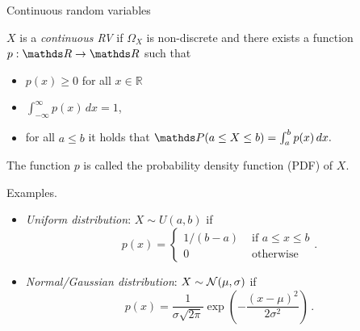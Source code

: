 \documentclass[11pt,compress,t,notes=noshow, xcolor=table]{beamer}
\begin{document}
\begin{vbframe}{Continuous random variables} 
	
	$X$ is a \emph{continuous RV} if $\Omega_X$ is non-discrete and there exists a function $p: \R \to \R$ such that 
%	
	\begin{itemize}
%		
		\item 
		$p(x) \geq 0$ for all $x \in \mathbb{R}$
%		
		\item $\int_{-\infty}^\infty p(x) \, dx = 1$,
%		
		\item for all $a \leq b$ it holds that	$
		\P(a \leq X \leq b) = \int_a^b p(x) \, dx .
		$
%
	\end{itemize} 
% 
	The function $p$ is called the probability density function (PDF) of $X$.
	
	\lz
	
	Examples.
	
	\begin{itemize}
			\item \emph{Uniform distribution}: $X \sim U(a,b)$ if 
		$$
		p(x) = \left\{ \begin{array}{cl}
			1/(b-a) & \text{ if } a \leq x \leq b  \\
			0 & \text{ otherwise}
		\end{array} \right. .
		$$
		\item \emph{Normal/Gaussian distribution}: $X \sim \mathcal{N}(\mu, \sigma)$ if
		$$
		p(x) = \frac{1}{\sigma \sqrt{2\pi}} \exp \left( -\frac{(x- \mu)^2 }{2 \sigma^2} \right)\, .
		$$ 
	\end{itemize}
\end{vbframe}
\end{document}
